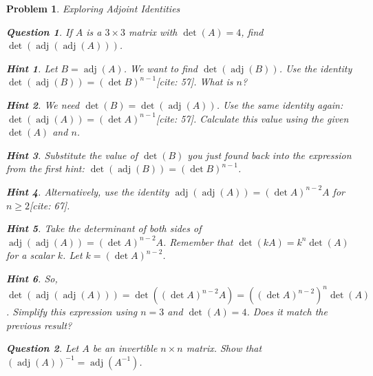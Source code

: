 \documentclass[12pt]{article}
\newtheorem{problem}{Problem}[section]
\newtheorem{question}{Question}[problem]
\theoremstyle{definition}
\newtheorem{hint}{Hint}[question]
\newcommand{\adj}{\operatorname{adj}}
\newcommand{\detm}{\operatorname{det}}
\begin{document}
\begin{problem}{Exploring Adjoint Identities}
    \begin{question}
        If $A$ is a $3 \times 3$ matrix with $\detm(A) = 4$, find $\detm(\adj(\adj(A)))$.
    \end{question}
    
        \begin{hint}
            Let $B = \adj(A)$. We want to find $\detm(\adj(B))$. Use the identity $\detm(\adj(B)) = (\detm B)^{n-1}$[cite: 57]. What is $n$?
        \end{hint}
        \begin{hint}
            We need $\detm(B) = \detm(\adj(A))$. Use the same identity again: $\detm(\adj(A)) = (\detm A)^{n-1}$[cite: 57]. Calculate this value using the given $\detm(A)$ and $n$.
        \end{hint}
        \begin{hint}
            Substitute the value of $\detm(B)$ you just found back into the expression from the first hint: $\detm(\adj(B)) = (\detm B)^{n-1}$.
        \end{hint}
        \begin{hint}
            Alternatively, use the identity $\adj(\adj(A)) = (\detm A)^{n-2} A$ for $n \ge 2$[cite: 67].
        \end{hint}
        \begin{hint}
             Take the determinant of both sides of $\adj(\adj(A)) = (\detm A)^{n-2} A$. Remember that $\detm(kA) = k^n \detm(A)$ for a scalar $k$. Let $k = (\detm A)^{n-2}$.
        \end{hint}
         \begin{hint}
             So, $\detm(\adj(\adj(A))) = \detm( (\detm A)^{n-2} A ) = ((\detm A)^{n-2})^n \detm(A)$. Simplify this expression using $n=3$ and $\detm(A)=4$. Does it match the previous result?
         \end{hint}
    

    \begin{question}
        Let $A$ be an invertible $n \times n$ matrix. Show that $(\adj(A))^{-1} = \adj(A^{-1})$.
    \end{question}
    

\end{problem}
\end{document}
